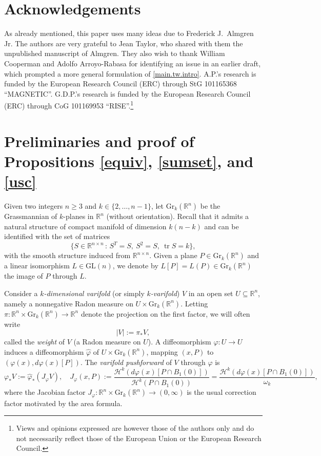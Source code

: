 \documentclass[11pt,a4paper]{amsart}
\newcommand{\R}{\mathbb{R}}
\renewcommand{\phi}{\varphi}
\theoremstyle{definition}
\renewcommand{\hat}{\widehat}
\newcommand{\gr}{\text{Gr}_k(\R^n)}
\begin{document}
\section*{Acknowledgements}
As already mentioned, this paper uses many ideas due to Frederick J.\ Almgren Jr.
The authors are very grateful to Jean Taylor, who shared with them the unpublished manuscript of Almgren. They also wish to thank William Cooperman and Adolfo Arroyo-Rabasa
for identifying an issue in an earlier draft, which prompted a more general formulation of
\cref{main.tw.intro}.
A.P.'s research is funded by the European Research Council (ERC) through StG 101165368 ``MAGNETIC''. G.D.P.'s research is funded by the European Research Council (ERC) through CoG   101169953 ``RISE''.\footnote{Views and opinions expressed are however those of the authors only and do not necessarily reflect those of the European Union or the European Research Council.}

\section{Preliminaries and proof of Propositions \ref{equiv}, \ref{sumset}, and \cref{usc}}\label{sec.setup}
Given two integers $n\ge3$ and $k\in\{2,\dots,n-1\}$, let $\gr$ be the Grassmannian of $k$-planes in $\R^n$ (without orientation). Recall that it admits a natural structure of compact manifold of dimension $k(n-k)$
and can be identified with the set of matrices
$$\{S\in\R^{n\times n}\,:\,S^T=S,\ S^2=S,\ \operatorname{tr}S=k\},$$
with the smooth structure induced from $\R^{n\times n}$. Given a plane $P\in\gr$ and a linear isomorphism
$L\in\text{GL}(n)$, we denote by $L[P]=L(P)\in\gr$ the image of $P$ through $L$.

Consider a \emph{$k$-dimensional varifold} (or simply \emph{$k$-varifold}) $V$ in an open set $U\subseteq\R^n$, namely a nonnegative Radon measure on $U\times\gr$. Letting $\pi:\R^n\times\gr\to\R^n$ denote the projection on the first factor, we will often write
$$|V|:=\pi_*V,$$
called the \emph{weight} of $V$ (a Radon measure on $U$).
A diffeomorphism $\phi:U\to U$ induces a diffeomorphism $\hat\phi$ of $U\times\gr$, mapping $(x,P)$
to $(\phi(x),d\phi(x)[P])$. The \emph{varifold pushforward} of $V$ through $\phi$ is
$$\phi_*V:=\hat\phi_*(J_\phi V),\quad J_\phi(x,P):=\frac{\mathcal{H}^k(d\phi(x)[P\cap B_1(0)])}{\mathcal{H}^k(P\cap B_1(0))}=\frac{\mathcal{H}^k(d\phi(x)[P\cap B_1(0)])}{\omega_k},$$
where the Jacobian factor $J_\phi:\R^n\times\gr\to(0,\infty)$ is the usual correction factor motivated by the area formula.
\end{document}
